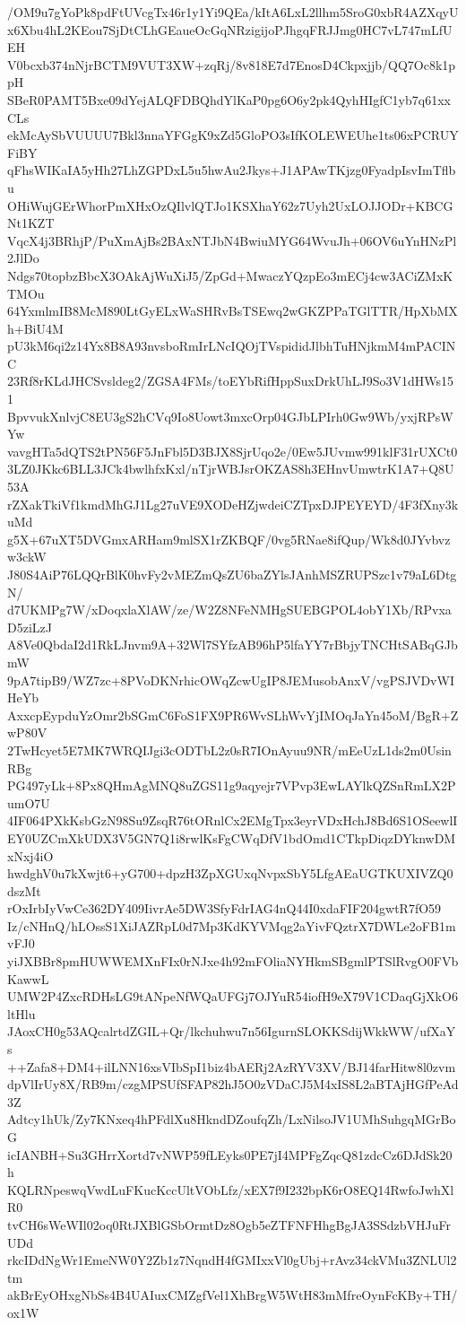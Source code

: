 /OM9u7gYoPk8pdFtUVcgTx46r1y1Yi9QEa/kItA6LxL2llhm5SroG0xbR4AZXqyU
x6Xbu4hL2KEou7SjDtCLhGEaueOcGqNRzigijoPJhgqFRJJmg0HC7vL747mLfUEH
V0bcxb374nNjrBCTM9VUT3XW+zqRj/8v818E7d7EnosD4Ckpxjjb/QQ7Oc8k1ppH
SBeR0PAMT5Bxe09dYejALQFDBQhdYlKaP0pg6O6y2pk4QyhHIgfC1yb7q61xxCLs
ekMcAySbVUUUU7Bkl3nnaYFGgK9xZd5GloPO3sIfKOLEWEUhe1ts06xPCRUYFiBY
qFhsWIKaIA5yHh27LhZGPDxL5u5hwAu2Jkys+J1APAwTKjzg0FyadpIsvImTflbu
OHiWujGErWhorPmXHxOzQIlvlQTJo1KSXhaY62z7Uyh2UxLOJJODr+KBCGNt1KZT
VqcX4j3BRhjP/PuXmAjBs2BAxNTJbN4BwiuMYG64WvuJh+06OV6uYnHNzPl2JlDo
Ndgs70topbzBbcX3OAkAjWuXiJ5/ZpGd+MwaczYQzpEo3mECj4cw3ACiZMxKTMOu
64YxmlmIB8McM890LtGyELxWaSHRvBsTSEwq2wGKZPPaTGlTTR/HpXbMXh+BiU4M
pU3kM6qi2z14Yx8B8A93nvsboRmIrLNcIQOjTVspididJlbhTuHNjkmM4mPACINC
23Rf8rKLdJHCSvsldeg2/ZGSA4FMs/toEYbRifHppSuxDrkUhLJ9So3V1dHWs151
BpvvukXnlvjC8EU3gS2hCVq9Io8Uowt3mxcOrp04GJbLPIrh0Gw9Wb/yxjRPsWYw
vavgHTa5dQTS2tPN56F5JnFbl5D3BJX8SjrUqo2e/0Ew5JUvmw991klF31rUXCt0
3LZ0JKkc6BLL3JCk4bwlhfxKxl/nTjrWBJsrOKZAS8h3EHnvUmwtrK1A7+Q8U53A
rZXakTkiVf1kmdMhGJ1Lg27uVE9XODeHZjwdeiCZTpxDJPEYEYD/4F3fXny3kuMd
g5X+67uXT5DVGmxARHam9mlSX1rZKBQF/0vg5RNae8ifQup/Wk8d0JYvbvzw3ckW
J80S4AiP76LQQrBlK0hvFy2vMEZmQsZU6baZYlsJAnhMSZRUPSzc1v79aL6DtgN/
d7UKMPg7W/xDoqxlaXlAW/ze/W2Z8NFeNMHgSUEBGPOL4obY1Xb/RPvxaD5ziLzJ
A8Ve0QbdaI2d1RkLJnvm9A+32Wl7SYfzAB96hP5lfaYY7rBbjyTNCHtSABqGJbmW
9pA7tipB9/WZ7zc+8PVoDKNrhicOWqZcwUgIP8JEMusobAnxV/vgPSJVDvWIHeYb
AxxcpEypduYzOmr2bSGmC6FoS1FX9PR6WvSLhWvYjIMOqJaYn45oM/BgR+ZwP80V
2TwHcyet5E7MK7WRQIJgi3cODTbL2z0sR7IOnAyuu9NR/mEeUzL1ds2m0UsinRBg
PG497yLk+8Px8QHmAgMNQ8uZGS11g9aqyejr7VPvp3EwLAYlkQZSnRmLX2PumO7U
4IF064PXkKsbGzN98Su9ZsqR76tORnlCx2EMgTpx3eyrVDxHchJ8Bd6S1OSeewlI
EY0UZCmXkUDX3V5GN7Q1i8rwlKsFgCWqDfV1bdOmd1CTkpDiqzDYknwDMxNxj4iO
hwdghV0u7kXwjt6+yG700+dpzH3ZpXGUxqNvpxSbY5LfgAEaUGTKUXIVZQ0dszMt
rOxIrbIyVwCe362DY409IivrAe5DW3SfyFdrIAG4nQ44I0xdaFIF204gwtR7fO59
Iz/cNHnQ/hLOssS1XiJAZRpL0d7Mp3KdKYVMqg2aYivFQztrX7DWLe2oFB1mvFJ0
yiJXBBr8pmHUWWEMXnFIx0rNJxe4h92mFOliaNYHkmSBgmlPTSlRvgO0FVbKawwL
UMW2P4ZxcRDHsLG9tANpeNfWQaUFGj7OJYuR54iofH9eX79V1CDaqGjXkO6ltHlu
JAoxCH0g53AQcalrtdZGIL+Qr/lkchuhwu7n56IgurnSLOKKSdijWkkWW/ufXaYs
++Zafa8+DM4+ilLNN16xsVIbSpI1biz4bAERj2AzRYV3XV/BJ14farHitw8l0zvm
dpVlIrUy8X/RB9m/czgMPSUfSFAP82hJ5O0zVDaCJ5M4xIS8L2aBTAjHGfPeAd3Z
Adtcy1hUk/Zy7KNxeq4hPFdlXu8HkndDZoufqZh/LxNilsoJV1UMhSuhgqMGrBoG
icIANBH+Su3GHrrXortd7vNWP59fLEyks0PE7jI4MPFgZqcQ81zdcCz6DJdSk20h
KQLRNpeswqVwdLuFKucKccUltVObLfz/xEX7f9I232bpK6rO8EQ14RwfoJwhXlR0
tvCH6sWeWIl02oq0RtJXBlGSbOrmtDz8Ogb5eZTFNFHhgBgJA3SSdzbVHJuFrUDd
rkcIDdNgWr1EmeNW0Y2Zb1z7NqndH4fGMIxxVl0gUbj+rAvz34ckVMu3ZNLUl2tm
akBrEyOHxgNbSs4B4UAIuxCMZgfVel1XhBrgW5WtH83mMfreOynFcKBy+TH/ox1W
